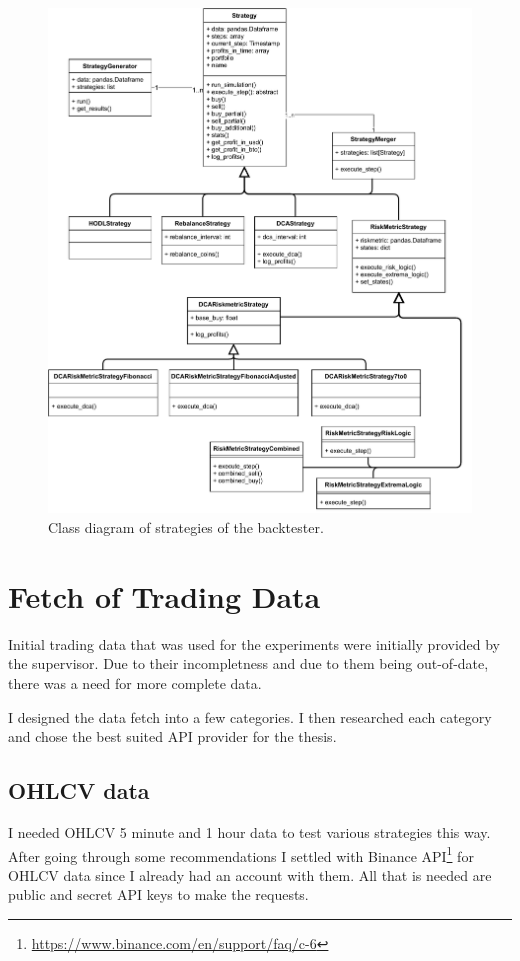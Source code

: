 \begin{figure}[!hbt]
    \centering
    \includegraphics[width=\columnwidth]{figures/strategy-class-diagram.pdf}
    \caption{Class diagram of strategies of the backtester.}
    \label{figure-strategy-class-diagram}
\end{figure}


\section{Fetch of Trading Data}
Initial trading data that was used for the experiments were initially provided by the supervisor. Due to their incompletness and due to them being out-of-date, there was a need for more complete data.

I designed the data fetch into a few categories. I then researched each category and chose the best suited API provider for the thesis.

\subsection*{OHLCV data}
I needed OHLCV 5 minute and 1 hour data to test various strategies this way. After going through some recommendations I settled with Binance API\footnote{\url{https://www.binance.com/en/support/faq/c-6}} for OHLCV data since I already had an account with them. All that is needed are public and secret API keys to make the requests.

